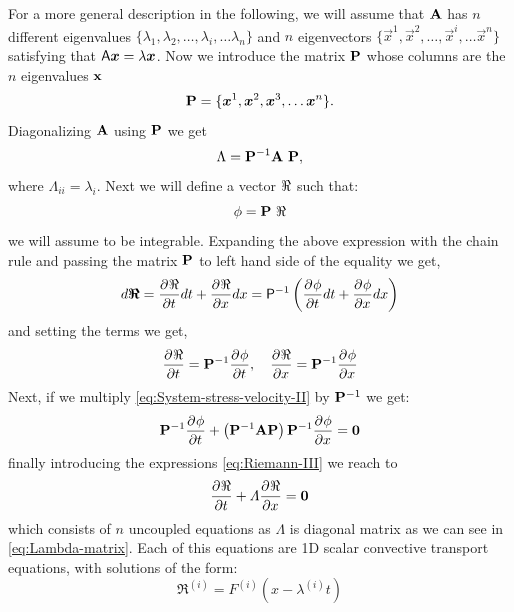For a more general description in the following, we will assume that $\mathbf{{A}}$ has $n$
different eigenvalues $\{ \lambda_1, \lambda_2, \ldots, \lambda_i, \ldots
\lambda_n \}$ and $n$ eigenvectors $\{ \vec{x}^1, \vec{x}^2, \ldots,
\vec{x}^i, \ldots \vec{x}^n \}$ satisfying that $\tens{A} \vec{x} =
\lambda \vec{x} $. Now we introduce the matrix $\mathbf{{P}}$ whose columns are the $n$
eigenvalues $\mathbf{{x}}$
\begin{equation}
  \label{eq:P-matrix}
\Matrix{P} = \{ \vec{x}^1, \vec{x}^2, \vec{x}^3, \ldots \vec{x}^n \}.
\end{equation}
Diagonalizing $\mathbf{{A}}$ using $\mathbf{{P}}$ we get
\begin{equation}
  \label{eq:Lambda-matrix}
  \Lambda = \mathbf{{P}}^{-1} \mathbf{{A}}\ \mathbf{{P}},
\end{equation}
where $ \Lambda_{ii} = \lambda_i$. Next we will define a vector $\mathbf{{\Re}}$ such that:
\begin{equation}
  \label{eq:Riemann-definition}
  \mathbf{{\phi}} = \mathbf{{P}}\ \mathbf{{\Re}}
\end{equation}
we will assume to be integrable. Expanding the above expression with
the chain rule and passing the matrix $\mathbf{{P}}$ to left hand side
of the equality we get,
\begin{equation}
  \label{eq:Riemann-II}
  d \vec{\Vector{\Re}} = \Deriv{\Vector{\Re}}{t}dt + \Deriv{\Vector{\Re}}{x}dx =
  \tens{P}^{-1}\left(\Deriv{\phi}{t}dt + \Deriv{\phi}{x}dx \right)
\end{equation}
and setting the terms we get,
\begin{equation}
  \label{eq:Riemann-III}
  \frac{\partial^{}{\mathbf{{\Re}}}}{ \partial {t}^{} } = \mathbf{{P}}^{-1}\frac{\partial^{}{\mathbf{{\phi}}}}{ \partial {t}^{} },\quad 
  \frac{\partial^{}{\mathbf{{\Re}}}}{ \partial {x}^{} } = \mathbf{{P}}^{-1}\frac{\partial^{}{\mathbf{{\phi}}}}{ \partial {x}^{} }
\end{equation}
Next, if we multiply \eqref{eq:System-stress-velocity-II} by
$\mathbf{{P}}^{-1}$ we get:
\begin{equation}
  \label{eq:System-stress-velocity-III}
  \mathbf{{P}}^{-1}\frac{\partial^{}{\mathbf{{\phi}}}}{ \partial {t}^{} } + \left(\mathbf{{P}}^{-1}\mathbf{{A}}\mathbf{{P}}
  \right)\mathbf{{P}}^{-1} \frac{\partial^{}{\mathbf{{\phi}}}}{ \partial {x}^{} } = \mathbf{{0}}
\end{equation}
finally introducing the expressions \eqref{eq:Riemann-III} we reach to
\begin{equation}
  \label{eq:System-stress-velocity-IV}
  \frac{\partial^{}{\mathbf{{\Re}}}}{ \partial {t}^{} } + \varLambda \frac{\partial^{}{\mathbf{{\Re}}}}{ \partial {x}^{} } = \mathbf{{0}}  
\end{equation}
which consists of $n$ uncoupled equations as $\varLambda$ is
diagonal matrix as we can see in \eqref{eq:Lambda-matrix}. Each of this
equations are 1D scalar convective transport equations, with solutions
of the form:
\begin{equation}
  \label{eq:SystemEquations_sigma_v_VI}
  \Re^{(i)} = F^{(i)} \left(x - \lambda^{(i)} t \right)
\end{equation}

